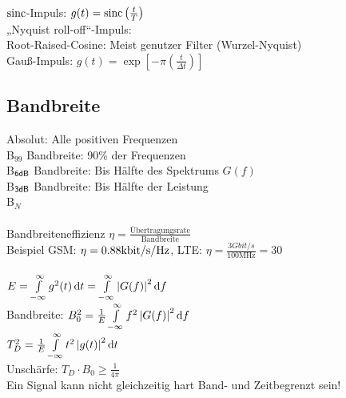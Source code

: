 \documentclass[fs, footer]{latex4ei}
\begin{document}
\begin{multicols*}{4}
	$\operatorname{sinc}$-Impuls: $g(t) = \operatorname{sinc}\left(\frac{t}{T}\right)$\\
	„Nyquist roll-off“-Impuls:\\
	Root-Raised-Cosine: Meist genutzer Filter (Wurzel-Nyquist)\\
	Gauß-Impuls: $g(t) = \exp\left[ -\pi\left( \frac{t}{\Delta t} \right) \right]$\\
	
	
	\subsection{Bandbreite}
	Absolut: Alle positiven Frequenzen\\
	B$_99$ Bandbreite: 90\% der Frequenzen\\
	B$_{\sf 6dB}$ Bandbreite: Bis Hälfte des Spektrums $G(f)$\\
	B$_{\sf 3dB}$ Bandbreite: Bis Hälfte der Leistung\\
	B$_N$\\
	\\
	Bandbreiteneffizienz $\eta = \frac{\text{Übertragungsrate}}{\text{Bandbreite}}$\\
	Beispiel GSM: $\eta = 0.88 \si{\kilo \bit/s \per \hertz}$, \quad LTE: $\eta = \frac{3 \si{Gbit/s}}{100 \si{\mega \hertz}} = 30$\\
	\\
	$E = \int\limits_{-\infty}^\infty g^2(t) \diff t = \int\limits_{-\infty}^\infty \abs{G(f)}^2 \diff f$\\
	Bandbreite: $B_0^2 = \frac{1}{E} \int\limits_{-\infty}^\infty f^2 \abs{G(f)}^2 \diff f$\\
	$T_D^2 = \frac{1}{E} \int\limits_{-\infty}^\infty t^2 \abs{g(t)}^2 \diff t$\\
	Unschärfe: $T_D \cdot B_0 \ge \frac{1}{4\pi}$\\
	Ein Signal kann nicht gleichzeitig hart Band- und Zeitbegrenzt sein! 


\sectionbox{
}
\end{multicols*}
\end{document}
